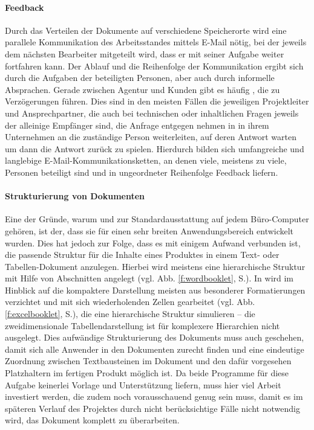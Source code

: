 \paragraph{Feedback} Durch das Verteilen der Dokumente auf verschiedene Speicherorte wird eine parallele Kommunikation des Arbeitsstandes mittels E-Mail nötig, bei der jeweils dem nächsten Bearbeiter mitgeteilt wird, dass er mit seiner Aufgabe weiter fortfahren kann. Der Ablauf und die Reihenfolge der Kommunikation ergibt sich durch die Aufgaben der beteiligten Personen, aber auch durch informelle Absprachen. Gerade zwischen Agentur und Kunden gibt es häufig , die zu Verzögerungen führen. Dies sind in den meisten Fällen die jeweiligen Projektleiter und Ansprechpartner, die auch bei technischen oder inhaltlichen Fragen jeweils der alleinige Empfänger sind, die Anfrage entgegen nehmen in in ihrem Unternehmen an die zuständige Person weiterleiten, auf deren Antwort warten um dann die Antwort zurück zu spielen. Hierdurch bilden sich umfangreiche und langlebige E-Mail-Kommunikationsketten, an denen viele, meistens zu viele, Personen beteiligt sind und in ungeordneter Reihenfolge Feedback liefern.

\paragraph{Strukturierung von Dokumenten} Eine der Gründe, warum  und  zur Standardausstattung auf jedem Büro-Computer gehören, ist der, dass sie für einen sehr breiten Anwendungsbereich entwickelt wurden. Dies hat jedoch zur Folge, dass es mit einigem Aufwand verbunden ist, die passende Struktur für die Inhalte eines Produktes in einem Text- oder Tabellen-Dokument anzulegen. Hierbei wird meistens eine hierarchische Struktur mit Hilfe von Abschnitten angelegt (vgl. Abb. \ref{f:wordbooklet}, S.\pageref{f:wordbooklet}). In  wird im Hinblick auf die kompaktere Darstellung meisten aus besonderer Formatierungen verzichtet und mit sich wiederholenden Zellen gearbeitet (vgl. Abb. \ref{f:excelbooklet}, S.\pageref{f:excelbooklet}), die eine hierarchische Struktur simulieren -- die zweidimensionale Tabellendarstellung ist für komplexere Hierarchien nicht ausgelegt. Dies aufwändige Strukturierung des Dokuments muss auch geschehen, damit sich alle Anwender in den Dokumenten zurecht finden und eine eindeutige Zuordnung zwischen Textbausteinen im Dokument und den dafür vorgesehen Platzhaltern im fertigen Produkt möglich ist. Da beide Programme für diese Aufgabe keinerlei Vorlage und Unterstützung liefern, muss hier viel Arbeit investiert werden, die zudem noch vorausschauend genug sein muss, damit es im späteren Verlauf des Projektes durch nicht berücksichtige Fälle nicht notwendig wird, das Dokument komplett zu überarbeiten.

